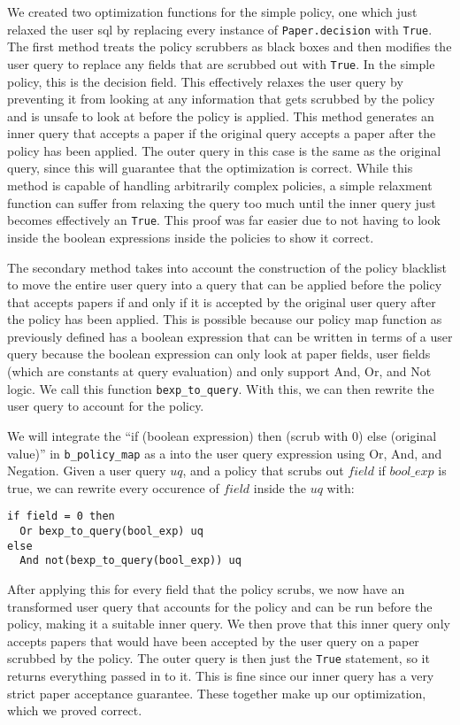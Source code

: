 \documentclass[11pt,journal]{IEEEtran}
\begin{document}
We created two optimization functions for the simple policy, one which just relaxed the user sql by replacing every instance of \texttt{Paper.decision} with \texttt{True}.
The first method treats the policy scrubbers as black boxes and then modifies the user query to replace any fields that are scrubbed out with \texttt{True}. In the simple policy, this is the decision field. This effectively relaxes the user query by preventing it from looking at any information that gets scrubbed by the policy and is unsafe to look at before the policy is applied. This method generates an inner query that accepts a paper if the original query accepts a paper after the policy has been applied. The outer query in this case is the same as the original query, since this will guarantee that the optimization is correct. While this method is capable of handling arbitrarily complex policies, a simple relaxment function can suffer from relaxing the query too much until the inner query just becomes effectively an \texttt{True}. This proof was far easier due to not having to look inside the boolean expressions inside the policies to show it correct. 

The secondary method takes into account the construction of the policy blacklist to move the entire user query into a query that can be applied before the policy that accepts papers if and only if it is accepted by the original user query after the policy has been applied. This is possible because our policy map function as previously defined has a boolean expression that can be written in terms of a user query because the boolean expression can only look at paper fields, user fields (which are constants at query evaluation) and only support And, Or, and Not logic. We call this function \texttt{bexp\_to\_query}. With this, we can then rewrite the user query to account for the policy. 

We will integrate the ``if (boolean expression) then (scrub with 0) else (original value)'' in \texttt{b\_policy\_map} as a into the user query expression using Or, And, and Negation. Given a user query $uq$, and a policy that scrubs out $field$ if $bool\_exp$ is true, we can rewrite every occurence of $field$ inside the $uq$ with: 

\begin{verbatim}
if field = 0 then 
  Or bexp_to_query(bool_exp) uq
else 
  And not(bexp_to_query(bool_exp)) uq
\end{verbatim}

After applying this for every field that the policy scrubs, we now have an transformed user query that accounts for the policy and can be run before the policy, making it a suitable inner query. We then prove that this inner query only accepts papers that would have been accepted by the user query on a paper scrubbed by the policy. The outer query is then just the \texttt{True} statement, so it returns everything passed in to it. This is fine since our inner query has a very strict paper acceptance guarantee. These together make up our optimization, which we proved correct. 
\end{document}
